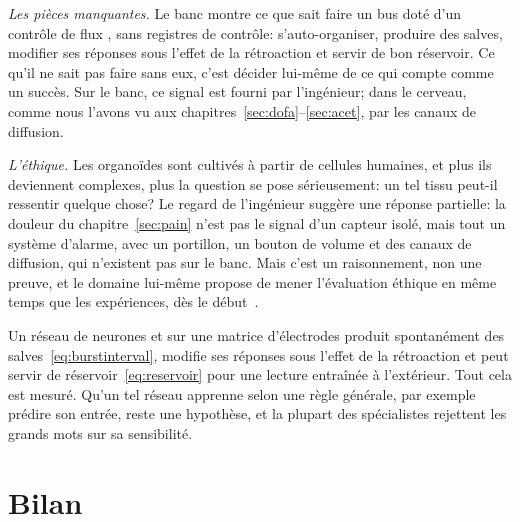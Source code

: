 \emph{Les pièces manquantes.} Le banc montre ce que sait faire un bus  doté d'un contrôle de flux , sans registres de contrôle: s'auto-organiser, produire des salves, modifier ses réponses sous l'effet de la rétroaction et servir de bon réservoir. Ce qu'il ne sait pas faire sans eux, c'est décider lui-même de ce qui compte comme un succès. Sur le banc, ce signal est fourni par l'ingénieur; dans le cerveau, comme nous l'avons vu aux chapitres~\ref{sec:dofa}--\ref{sec:acet}, par les canaux de diffusion.

\emph{L'éthique.} Les organoïdes sont cultivés à partir de cellules humaines, et plus ils deviennent complexes, plus la question se pose sérieusement: un tel tissu peut-il ressentir quelque chose? Le regard de l'ingénieur suggère une réponse partielle: la douleur du chapitre~\ref{sec:pain} n'est pas le signal d'un capteur isolé, mais tout un système d'alarme, avec un portillon, un bouton de volume et des canaux de diffusion, qui n'existent pas sur le banc. Mais c'est un raisonnement, non une preuve, et le domaine lui-même propose de mener l'évaluation éthique en même temps que les expériences, dès le début~\cite{Smirnova2023}.

\begin{keyblock}
\begin{proposition}
\label{prop:livingmachine}
Un réseau de neurones  et  sur une matrice d'électrodes produit spontanément des salves~\eqref{eq:burstinterval}, modifie ses réponses sous l'effet de la rétroaction et peut servir de réservoir~\eqref{eq:reservoir} pour une lecture entraînée à l'extérieur. Tout cela est mesuré. Qu'un tel réseau apprenne selon une règle générale, par exemple prédire son entrée, reste une hypothèse, et la plupart des spécialistes rejettent les grands mots sur sa \og sensibilité\fg{}.
\end{proposition}
\end{keyblock}



\section{Bilan}

